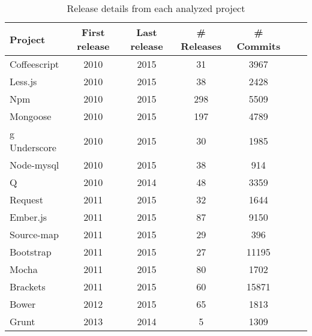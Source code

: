 \begin{table}[!hbt]
    \begin{center}
        \caption{Release details from each analyzed project}
        \label{tab:release_details}
        \begin{tabular}{l| c c c c c c}
            \toprule
            \textbf{Project} & \textbf{First release} & \textbf{Last release}  & \textbf{\# Releases} & \textbf{\# Commits} \\ \midrule
             Coffeescript & 2010    & 2015  &    31 &      3967 \\
             Less.js      & 2010    & 2015  &    38 &      2428 \\
             Npm          & 2010    & 2015  &   298 &      5509 \\
             Mongoose     & 2010    & 2015  &   197 &      4789 \\g
             Underscore   & 2010    & 2015  &    30 &      1985 \\
             Node-mysql   & 2010    & 2015  &    38 &       914 \\
             Q            & 2010    & 2014  &    48 &      3359 \\
             Request      & 2011    & 2015  &    32 &      1644 \\
             Ember.js     & 2011    & 2015  &    87 &      9150 \\
             Source-map   & 2011    & 2015  &    29 &       396 \\
             Bootstrap    & 2011    & 2015  &    27 &     11195 \\
             Mocha        & 2011    & 2015  &    80 &      1702 \\
             Brackets     & 2011    & 2015  &    60 &     15871 \\
             Bower        & 2012    & 2015  &    65 &      1813 \\
             Grunt        & 2013    & 2014  &     5 &      1309 \\ \bottomrule
        \end{tabular}
    \end{center}
\end{table}


